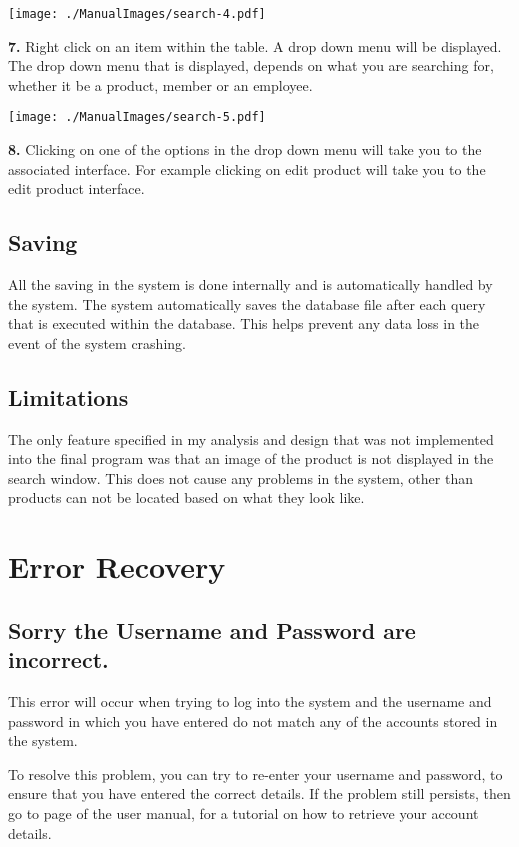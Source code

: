 \texttt{[image: ./ManualImages/search-4.pdf]}

\textbf{7.} Right click on an item within the table. A drop down menu will be displayed. The drop down menu that is displayed, depends on what you are searching for, whether it be a product, member or an employee.

\texttt{[image: ./ManualImages/search-5.pdf]}

\textbf{8.} Clicking on one of the options in the drop down menu will take you to the associated interface. For example clicking on edit product will take you to the edit product interface.


\subsection{Saving}

All the saving in the system is done internally and is automatically handled by the system. The system automatically saves the database file after each query that is executed within the database. This helps prevent any data loss in the event of the system crashing.

\subsection{Limitations}

The only feature specified in my analysis and design that was not implemented into the final program was that an image of the product is not displayed in the search window. This does not cause any problems in the system, other than products can not be located based on what they look like.

\section{Error Recovery}

\subsection{Sorry the Username and Password are incorrect.}

This error will occur when trying to log into the system and the username and password in which you have entered do not match any of the accounts stored in the system.

To resolve this problem, you can try to re-enter your username and password, to ensure that you have entered the correct details. If the problem still persists, then go to page \pageref{fig:Forgetting Your User-name or Password} of the user manual, for a tutorial on how to retrieve your account details.

